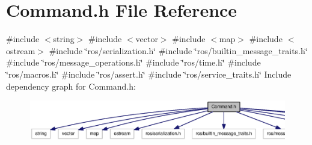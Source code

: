 \section{\-Command.\-h \-File \-Reference}
\label{Command_8h}
{\ttfamily \#include $<$string$>$}\*
{\ttfamily \#include $<$vector$>$}\*
{\ttfamily \#include $<$map$>$}\*
{\ttfamily \#include $<$ostream$>$}\*
{\ttfamily \#include \char`\"{}ros/serialization.\-h\char`\"{}}\*
{\ttfamily \#include \char`\"{}ros/builtin\-\_\-message\-\_\-traits.\-h\char`\"{}}\*
{\ttfamily \#include \char`\"{}ros/message\-\_\-operations.\-h\char`\"{}}\*
{\ttfamily \#include \char`\"{}ros/time.\-h\char`\"{}}\*
{\ttfamily \#include \char`\"{}ros/macros.\-h\char`\"{}}\*
{\ttfamily \#include \char`\"{}ros/assert.\-h\char`\"{}}\*
{\ttfamily \#include \char`\"{}ros/service\-\_\-traits.\-h\char`\"{}}\*
\-Include dependency graph for \-Command.\-h\-:
\nopagebreak
\begin{figure}[H]
\begin{center}
\leavevmode
\includegraphics[width=350pt]{Command_8h__incl}
\end{center}
\end{figure}
